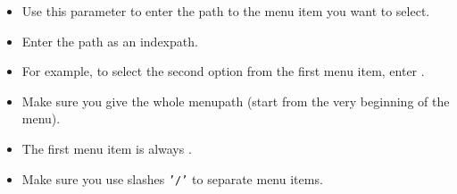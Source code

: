 
\begin{itemize}
\item Use this parameter to enter the path to the menu item you want to select.
\item Enter the path as an indexpath.
\item For example, to select the second option from the first menu item, enter .
\item Make sure you give the whole menupath (start from the very beginning of the menu).
\item The first menu item is always . 
\item Make sure you use slashes {\tt '/'} to separate menu items.
 
\end{itemize}